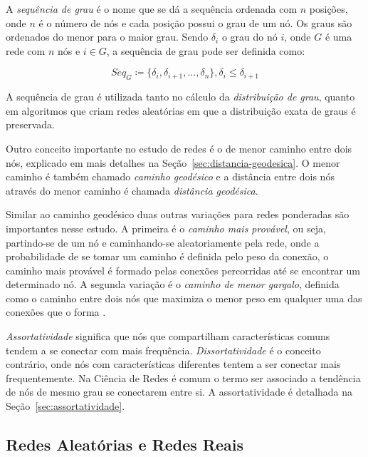 \documentclass[12pt,a4paper,final]{article}
\newcommand{\defn}{\coloneqq} %
\begin{document}
A \textit{sequência de grau} é o nome que se dá a sequência ordenada com $n$ posições, onde $n$ é o número de nós e cada posição possui o grau de um nó. Os graus são ordenados do menor para o maior grau. Sendo $\delta_i$ o grau do nó $i$, onde $G$ é uma rede com $n$ nós e $i \in G$, a sequência de grau pode ser definida como:

\begin{equation} \label{eq:sequencia-grau}
\textit{Seq}_G \defn \{\delta_i, \delta_{i+1}, \ldots, \delta_n\}, \delta_i \le \delta_{i+1}
\end{equation}

A sequência de grau é utilizada tanto no cálculo da \textit{distribuição de grau}, quanto em algoritmos que criam redes aleatórias em que a distribuição exata de graus é preservada.

Outro conceito importante no estudo de redes é o de menor caminho entre dois nós, explicado em mais detalhes na Seção~\ref{sec:distancia-geodesica}. O menor caminho é também chamado \textit{caminho geodésico} e a distância entre dois nós através do menor caminho é chamada \textit{distância geodésica}.


Similar ao caminho geodésico duas outras variações para redes ponderadas são importantes nesse estudo. A primeira é o \textit{caminho mais provável}, ou seja, partindo-se de um nó e caminhando-se aleatoriamente pela rede, onde a probabilidade de se tomar um caminho é definida pelo peso da conexão, o caminho mais provável é formado pelas conexões percorridas até se encontrar um determinado nó. A segunda variação é o \textit{caminho de menor gargalo}, definida como o caminho entre dois nós que maximiza o menor peso em qualquer uma das conexões que o forma \cite{Goldbarg2012-uc}.


\textit{Assortatividade} significa que nós que compartilham características comuns tendem a se conectar com mais frequência. \textit{Dissortatividade} é o conceito contrário, onde nós com características diferentes tentem a ser conectar mais frequentemente. Na Ciência de Redes é comum o termo ser associado a tendência de nós de mesmo grau se conectarem entre si. A assortatividade é detalhada na Seção~\ref{sec:assortatividade}.

\subsection{Redes Aleatórias e Redes Reais} \label{sec:redes-aleatorias}
\end{document}
